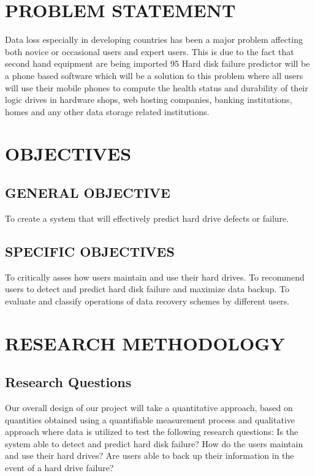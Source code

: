 \documentclass{article}
\begin{document}
\section{PROBLEM STATEMENT}
Data loss especially in developing countries has been a major problem affecting both novice or occasional users and expert users. This is due to the fact that second hand equipment are being imported 95%
Hard disk failure predictor will be a phone based software which will be  a solution to this problem where  all users will use their mobile phones to compute the health status and  durability of  their  logic drives in hardware shops, web hosting companies, banking institutions, homes and any other data storage related institutions. 
\section{OBJECTIVES}
\subsection{GENERAL OBJECTIVE}
To create a system that will effectively predict hard drive defects or failure.
\subsection{SPECIFIC OBJECTIVES}
To critically asses how users maintain and use their hard drives.
To recommend users to detect and predict hard disk failure and maximize data backup.
To evaluate and classify operations of data recovery schemes by different users.

\section{RESEARCH METHODOLOGY}
\subsection{Research Questions} 
Our overall design of our project will take a quantitative approach, based on quantities obtained using a quantifiable measurement process and qualitative approach where data is utilized to test the following research questions: 
Is the system able to detect and predict hard disk failure? 
How do the users maintain and use their hard drives? 
Are users able to back up their information in the event of a hard drive failure? 
\end{document}

